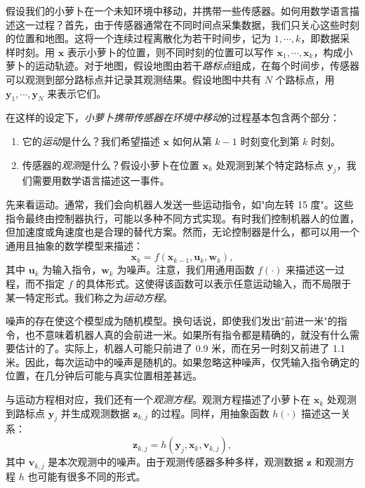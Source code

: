 假设我们的小萝卜在一个未知环境中移动，并携带一些传感器。如何用数学语言描述这一过程？首先，由于传感器通常在不同时间点采集数据，我们只关心这些时刻的位置和地图。这将一个连续过程离散化为若干时间步，记为 $1, \cdots, k$，即数据采样时刻。用 $\mathbf{x}$ 表示小萝卜的位置，则不同时刻的位置可以写作 $\mathbf{x}_1,\cdots,\mathbf{x}_k$，构成小萝卜的运动轨迹。对于地图，假设地图由若干\emph{路标点}组成，在每个时间步，传感器可以观测到部分路标点并记录其观测结果。假设地图中共有 $N$ 个路标点，用 $\mathbf{y}_1, \cdots, \mathbf{y}_N$ 来表示它们。

在这样的设定下，\textit{小萝卜携带传感器在环境中移动}的过程基本包含两个部分：

\begin{enumerate}
\item 它的\emph{运动}是什么？我们希望描述 $\mathbf{x}$ 如何从第 $k-1$ 时刻变化到第 $k$ 时刻。
\item 传感器的\emph{观测}是什么？假设小萝卜在位置 $\mathbf{x}_k$ 处观测到某个特定路标点 $\mathbf{y}_j$，我们需要用数学语言描述这一事件。
\end{enumerate}

先来看运动。通常，我们会向机器人发送一些运动指令，如"向左转 15 度"。这些指令最终由控制器执行，可能以多种不同方式实现。有时我们控制机器人的位置，但加速度或角速度也是合理的替代方案。然而，无论控制器是什么，都可以用一个通用且抽象的数学模型来描述：
\begin{equation}
{\mathbf{x}_k} = f\left( {{\mathbf{x}_{k - 1}},{\mathbf{u}_k}, \mathbf{w}_k} \right),
\end{equation}
其中 $\mathbf{u}_k$ 为输入指令，$\mathbf{w}_k$ 为噪声。注意，我们用通用函数 $f(\cdot)$ 来描述这一过程，而不指定 $f$ 的具体形式。这使得该函数可以表示任意运动输入，而不局限于某一特定形式。我们称之为\emph{运动方程}。

噪声的存在使这个模型成为随机模型。换句话说，即使我们发出"前进一米"的指令，也不意味着机器人真的会前进一米。如果所有指令都是精确的，就没有什么需要估计的了。实际上，机器人可能只前进了 0.9 米，而在另一时刻又前进了 1.1 米。因此，每次运动中的噪声是随机的。如果忽略这种噪声，仅凭输入指令确定的位置，在几分钟后可能与真实位置相差甚远。

与运动方程相对应，我们还有一个\textit{观测方程}。观测方程描述了小萝卜在 $\mathbf{x}_k$ 处观测到路标点 $\mathbf{y}_j$ 并生成观测数据 $\mathbf{z}_{k,j}$ 的过程。同样，用抽象函数 $h(\cdot)$ 描述这一关系：
\begin{equation}
{\mathbf{z}_{k,j}} = h\left( {{\mathbf{y}_j},{\mathbf{x}_k}, \mathbf{v}_{k,j} } \right),
\end{equation}
其中 $\mathbf{v}_{k,j}$ 是本次观测中的噪声。由于观测传感器多种多样，观测数据 $\mathbf{z}$ 和观测方程 $h$ 也可能有很多不同的形式。

